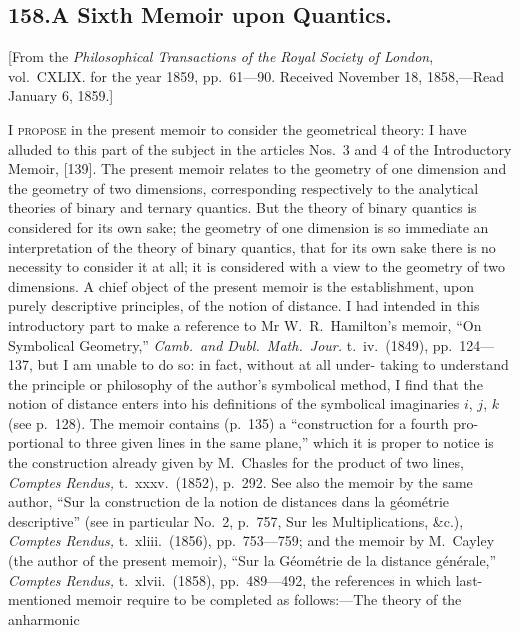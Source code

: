 \documentclass[11pt,a4paper]{book}
\begin{document}
\begin{center}
\section*{158.\quad A Sixth Memoir upon Quantics.}

\begin{flushleft}
\small
[From the \textit{Philosophical Transactions of the Royal Society of London}, vol.~CXLIX.
for the year 1859, pp.~61---90. Received November 18, 1858,---Read January 6, 1859.]
\end{flushleft}

I \textsc{propose} in the present memoir to consider the geometrical theory: I have
alluded to this part of the subject in the articles Nos.~3 and 4 of the Introductory
Memoir, [139]. The present memoir relates to the geometry of one dimension and the
geometry of two dimensions, corresponding respectively to the analytical theories of
binary and ternary quantics. But the theory of binary quantics is considered for its
own sake; the geometry of one dimension is so immediate an interpretation of the
theory of binary quantics, that for its own sake there is no necessity to consider it at
all; it is considered with a view to the geometry of two dimensions. A chief object
of the present memoir is the establishment, upon purely descriptive principles, of the
notion of distance. I had intended in this introductory part to make a reference to
Mr W.~R.~Hamilton's memoir, ``On Symbolical Geometry,'' \textit{Camb.~and Dubl.~Math.~Jour.}
t.~iv.~(1849), pp.~124---137, but I am unable to do so: in fact, without at all under-
taking to understand the principle or philosophy of the author's symbolical method, I
find that the notion of distance enters into his definitions of the symbolical imaginaries
$i$, $j$, $k$ (see p.~128). The memoir contains (p.~135) a ``construction for a fourth pro-
portional to three given lines in the same plane,'' which it is proper to notice is the
construction already given by M.~Chasles for the product of two lines, \textit{Comptes Rendus,}
t.~xxxv.\ (1852), p.~292. See also the memoir by the same author, ``Sur la construction
de la notion de distances dans la g\'{e}om\'{e}trie descriptive'' (see in particular No.~2, p.~757,
Sur les Multiplications, \&c.), \textit{Comptes Rendus,} t.~xliii.\ (1856), pp.~753---759; and the memoir
by M.~Cayley (the author of the present memoir), ``Sur la G\'{e}om\'{e}trie de la distance
g\'{e}n\'{e}rale,'' \textit{Comptes Rendus,} t.~xlvii.\ (1858), pp.~489---492, the references in which last-
mentioned memoir require to be completed as follows:---The theory of the anharmonic

\end{center}
\end{document}
